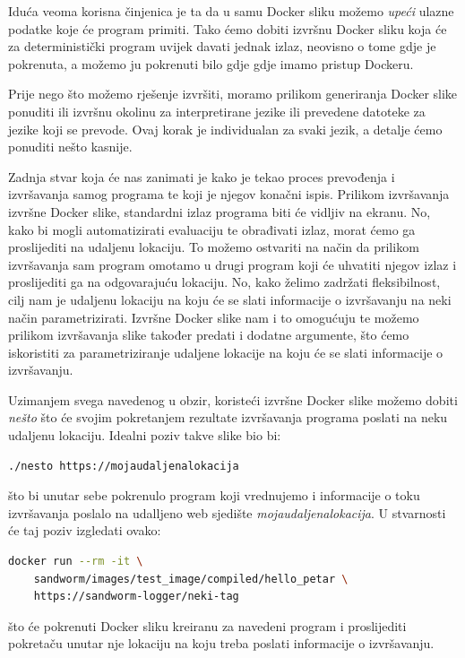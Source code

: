 \documentclass[times, utf8, zavrsni]{fer}
\begin{document}
Iduća veoma korisna činjenica je ta da u samu Docker sliku možemo \textit{upeći} ulazne podatke koje će program primiti. Tako ćemo dobiti izvršnu Docker sliku koja će za deterministički program uvijek davati jednak izlaz, neovisno o tome gdje je pokrenuta, a možemo ju pokrenuti bilo gdje gdje imamo pristup Dockeru.

Prije nego što možemo rješenje izvršiti, moramo prilikom generiranja Docker slike ponuditi ili izvršnu okolinu za interpretirane jezike ili prevedene datoteke za jezike koji se prevode. Ovaj korak je individualan za svaki jezik, a detalje ćemo ponuditi nešto kasnije.

Zadnja stvar koja će nas zanimati je kako je tekao proces prevođenja i izvršavanja samog programa te koji je njegov konačni ispis. Prilikom izvršavanja izvršne Docker slike, standardni izlaz programa biti će vidljiv na ekranu. No, kako bi mogli automatizirati evaluaciju te obrađivati izlaz, morat ćemo ga proslijediti na udaljenu lokaciju. To možemo ostvariti na način da prilikom izvršavanja sam program omotamo u drugi program koji će uhvatiti njegov izlaz i proslijediti ga na odgovarajuću lokaciju. No, kako želimo zadržati fleksibilnost, cilj nam je udaljenu lokaciju na koju će se slati informacije o izvršavanju na neki način parametrizirati. Izvršne Docker slike nam i to omogućuju te možemo prilikom izvršavanja slike također predati i dodatne argumente, što ćemo iskoristiti za parametriziranje udaljene lokacije na koju će se slati informacije o izvršavanju.

Uzimanjem svega navedenog u obzir, koristeći izvršne Docker slike možemo dobiti \textit{nešto} što će svojim pokretanjem rezultate izvršavanja programa poslati na neku udaljenu lokaciju. Idealni poziv takve slike bio bi:

\begin{lstlisting}
./nesto https://mojaudaljenalokacija
\end{lstlisting}

što bi unutar sebe pokrenulo program koji vrednujemo i informacije o toku izvršavanja poslalo na udalljeno web sjedište {\textit{mojaudaljenalokacija}}. U stvarnosti će taj poziv izgledati ovako:

\begin{lstlisting}[language=Bash]
docker run --rm -it \
	sandworm/images/test_image/compiled/hello_petar \
	https://sandworm-logger/neki-tag
\end{lstlisting}

što će pokrenuti Docker sliku kreiranu za navedeni program i proslijediti pokretaču unutar nje lokaciju na koju treba poslati informacije o izvršavanju.
\end{document}
